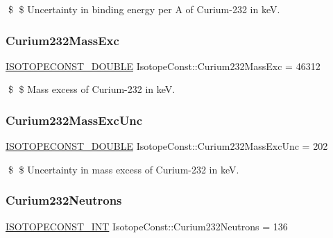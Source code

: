 \$ \$ Uncertainty in binding energy per A of Curium-\/232 in keV. \mbox{\label{group___isotope_const-_curium-_cm232_ga60dbeeeb55f19dbd9b783d019746ec6f}} 
\subsubsection{\texorpdfstring{Curium232\+Mass\+Exc}{Curium232MassExc}}
{\footnotesize\ttfamily \mbox{\hyperlink{group___isotope_const-_macros_ga8f45a7272ce02c0b4c65c44636ed719a}{I\+S\+O\+T\+O\+P\+E\+C\+O\+N\+S\+T\+\_\+\+D\+O\+U\+B\+LE}} Isotope\+Const\+::\+Curium232\+Mass\+Exc = 46312}

\$ \$ Mass excess of Curium-\/232 in keV. \mbox{\label{group___isotope_const-_curium-_cm232_ga74bc55f9cbb1bdb631825dd917acdafd}} 
\subsubsection{\texorpdfstring{Curium232\+Mass\+Exc\+Unc}{Curium232MassExcUnc}}
{\footnotesize\ttfamily \mbox{\hyperlink{group___isotope_const-_macros_ga8f45a7272ce02c0b4c65c44636ed719a}{I\+S\+O\+T\+O\+P\+E\+C\+O\+N\+S\+T\+\_\+\+D\+O\+U\+B\+LE}} Isotope\+Const\+::\+Curium232\+Mass\+Exc\+Unc = 202}

\$ \$ Uncertainty in mass excess of Curium-\/232 in keV. \mbox{\label{group___isotope_const-_curium-_cm232_ga78a8c2f95c1820c804e9bca0d734710e}} 
\subsubsection{\texorpdfstring{Curium232\+Neutrons}{Curium232Neutrons}}
{\footnotesize\ttfamily \mbox{\hyperlink{group___isotope_const-_macros_ga5f18360b3e99483a35c32d789e62621c}{I\+S\+O\+T\+O\+P\+E\+C\+O\+N\+S\+T\+\_\+\+I\+NT}} Isotope\+Const\+::\+Curium232\+Neutrons = 136}

